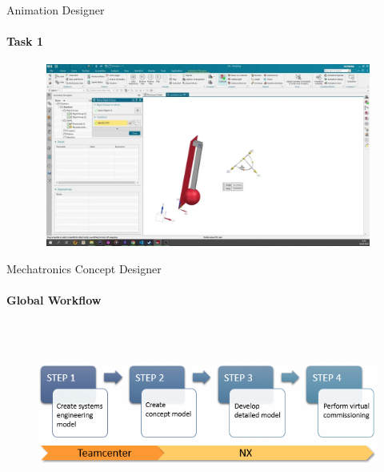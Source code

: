 \documentclass[aspectratio=169]{beamer}
\begin{document}
\begin{frame}[t]{Animation Designer}
    \framesubtitle{Task 1}
    \vspace{-0.6cm}
    \begin{figure}[H]
        \href{https://disk.yandex.ru/i/Jn6CjUOzpJXqhg}{
            \centering\includegraphics[height=6cm,width=1\textwidth,keepaspectratio]{anim_video_preview.png}}
        \label{fig:anim_video_preview.png}
    \end{figure}
\end{frame}

\begin{frame}[t]{Mechatronics Concept Designer}
\framesubtitle{Global Workflow}
    \vspace{-0.6cm}
    \begin{figure}[H]
        \centering\includegraphics[height=6cm,width=1\textwidth,keepaspectratio]{mcd_overview_flowchart.png}
        \label{fig:mcd_overview_flowchart.png}
    \end{figure}
\end{frame}
\end{document}
